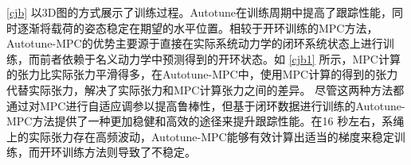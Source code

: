 \documentclass[lang=chs, degree=master, blindreview=true, winfonts=true]{yanputhesis}
\begin{document}
\autoref{cjb} 以3D图的方式展示了训练过程。Autotune在训练周期中提高了跟踪性能，同时逐渐将载荷的姿态稳定在期望的水平位置。相较于开环训练的MPC方法，Autotune-MPC的优势主要源于直接在实际系统动力学的闭环系统状态上进行训练，而前者依赖于名义动力学中预测得到的开环状态。如 \autoref{cjb1} 所示，MPC计算的张力比实际张力平滑得多，在Autotune-MPC中，使用MPC计算的得到的张力代替实际张力，解决了实际张力和MPC计算张力之间的差异。
尽管这两种方法都通过对MPC进行自适应调参以提高鲁棒性，但基于闭环数据进行训练的Autotune-MPC方法提供了一种更加稳健和高效的途径来提升跟踪性能。在16
秒左右，系绳上的实际张力存在高频波动，Autotune-MPC能够有效计算出适当的梯度来稳定训练，而开环训练方法则导致了不稳定。
\end{document}
